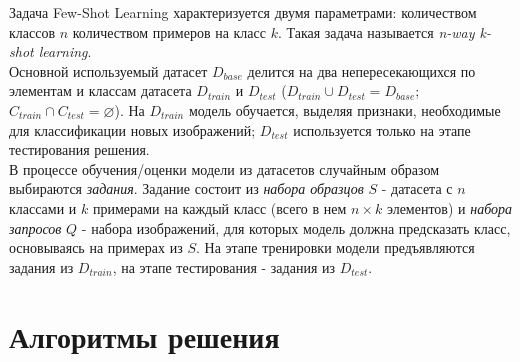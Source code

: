 \documentclass[a4paper, 12pt]{report}
\begin{document}
Задача Few-Shot Learning характеризуется двумя параметрами: количеством классов $n$ количеством примеров на класс $k$. Такая задача называется \textit{n-way k-shot learning}. \\

Основной используемый датасет $D_{base}$ делится на два непересекающихся по элементам и классам датасета $D_{train}$ и $D_{test}$ ($D_{train} \cup D_{test} = D_{base}$; $ C_{train} \cap C_{test} = \varnothing $). На $D_{train}$ модель обучается, выделяя признаки, необходимые для классификации новых изображений; $D_{test}$ используется только на этапе тестирования решения. \\

В процессе обучения/оценки модели из датасетов случайным образом выбираются \textit{задания}. Задание состоит из \textit{набора образцов} $S$ - датасета с $n$ классами и $k$ примерами на каждый класс (всего в нем $n \times k$ элементов) и \textit{набора запросов} $Q$ - набора изображений, для которых модель должна предсказать класс, основываясь на примерах из $S$. На этапе тренировки модели предъявляются задания из $D_{train}$, на этапе тестирования - задания из $D_{test}$.

\section {Алгоритмы решения}

\end{document}

